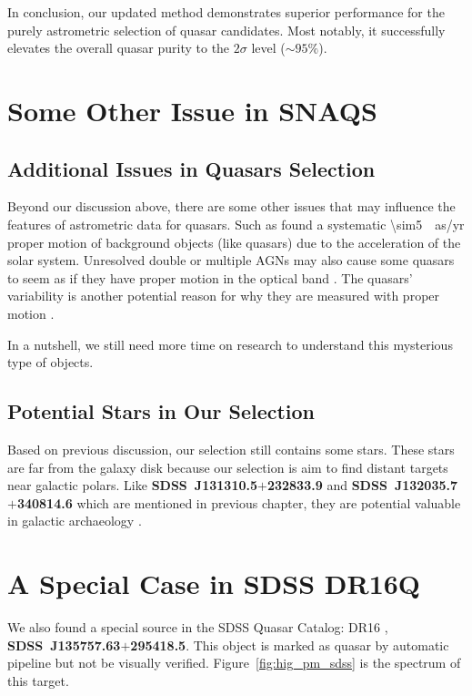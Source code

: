 In conclusion, our updated method demonstrates superior performance for the purely astrometric selection of quasar candidates. Most notably, it successfully elevates the overall quasar purity to the $2\sigma$ level ($\sim 95\%$).

\section{Some Other Issue in SNAQS}

\subsection{Additional Issues in Quasars Selection}

Beyond our discussion above, there are some other issues that may influence the features of astrometric data for quasars. Such as \citet{gaiacollaborationGaiaEarlyData2021} found a systematic \qty{\sim5}{\mu as/yr} proper motion of background objects (like quasars) due to the acceleration of the solar system. Unresolved double or multiple AGNs may also cause some quasars to seem as if they have proper motion in the optical band \citep{makarovQuasarsProperMotions2022}. The quasars' variability is another potential reason for why they are measured with proper motion \citep{bachchanGaiaReferenceFrame2016}. 

In a nutshell, we still need more time on research to understand this mysterious type of objects.

\subsection{Potential Stars in Our Selection}

Based on previous discussion, our selection still contains some stars. These stars are far from the galaxy disk because our selection is aim to find distant targets near galactic polars. Like \textbf{SDSS~J131310.5$+$232833.9} and \textbf{SDSS~J132035.7$+$340814.6} which are mentioned in previous chapter, they are potential valuable in galactic archaeology \citep{freemanNewGalaxySignatures2002}.

\section{A Special Case in SDSS DR16Q}

We also found a special source in the SDSS Quasar Catalog: DR16 \citep{lykeSloanDigitalSky2020}, \textbf{SDSS~J135757.63$+$295418.5}. This object is marked as quasar by automatic pipeline but not be visually verified. Figure~\ref{fig:hig_pm_sdss} is the spectrum of this target.

